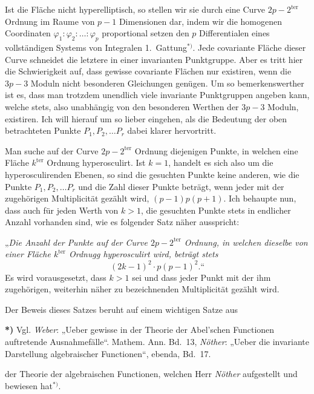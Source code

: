 \documentclass{article}
\begin{document}
Ist die Fläche nicht hyperelliptisch, so stellen wir sie durch eine Curve $2p-2^{\text{ter}}$ Ordnung im Raume von $p-1$ Dimensionen dar, indem wir die homogenen Coordinaten $\varphi_1 : \varphi_2 : \dots : \varphi_p$ proportional setzen den $p$ Differentialen eines vollständigen Systems von Integralen 1.~Gattung${}^{*)}$. Jede covariante Fläche dieser Curve schneidet die letztere in einer invarianten Punktgruppe. Aber es tritt hier die Schwierigkeit auf, dass gewisse covariante Flächen nur existiren, wenn die $3p-3$ Moduln nicht besonderen Gleichungen genügen. Um so bemerkenswerther ist es, dass man trotzdem unendlich viele invariante Punktgruppen angeben kann, welche stets, also unabhängig von den besonderen Werthen der $3p-3$ Moduln, existiren. Ich will hierauf um so lieber eingehen, als die Bedeutung der oben betrachteten Punkte $P_1, P_2, \dots P_r$ dabei klarer hervortritt.

Man suche auf der Curve $2p-2^{\text{ter}}$ Ordnung diejenigen Punkte, in welchen eine Fläche $k^{\text{ter}}$ Ordnung hyperosculirt. Ist $k = 1$, handelt es sich also um die hyperosculirenden Ebenen, so sind die gesuchten Punkte keine anderen, wie die Punkte $P_1, P_2, \dots P_r$ und die Zahl dieser Punkte beträgt, wenn jeder mit der zugehörigen Multiplicität gezählt wird, $(p-1)p(p+1)$. Ich behaupte nun, dass auch für jeden Werth von $k > 1$, die gesuchten Punkte stets in endlicher Anzahl vorhanden sind, wie es folgender Satz näher ausspricht:

„\emph{Die Anzahl der Punkte auf der Curve $2p-2^{\text{ter}}$ Ordnung, in welchen dieselbe von einer Fläche $k^{\text{ter}}$ Ordnugg hyperosculirt wird, beträgt stets}
\[
(2k-1)^2 \cdot p(p-1)^2.\text{“}
\]
Es wird vorausgesetzt, dass $k > 1$ sei und dass jeder Punkt mit der ihm zugehörigen, weiterhin näher zu bezeichnenden Multiplicität gezählt wird.

Der Beweis dieses Satzes beruht auf einem wichtigen Satze aus

\textbf{*)} Vgl. \emph{Weber}: „Ueber gewisse in der Theorie der Abel'schen Functionen auftretende Ausnahmefälle“. Mathem. Ann. Bd.~13, \emph{Nöther}: „Ueber die invariante Darstellung algebraischer Functionen“, ebenda, Bd.~17.

der Theorie der algebraischen Functionen, welchen Herr \emph{Nöther} aufgestellt und bewiesen hat${}^{*)}$.
\end{document}
